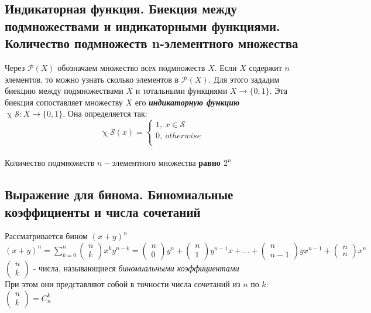 \documentclass[a4paper]{article}
\begin{document}
\subsection{Индикаторная функция. Биекция между подмножествами и индикаторными функциями. Количество подмножеств n-элементного множества}
\label{sec:1.35}Через $\mathcal{P}(X)$ обозначаем множество всех подмножеств $X$. Если $X$ содержит $n$ элементов, то можно узнать сколько элементов в $\mathcal{P}(X)$. Для этого зададим биекцию между подмножествами $X$ и тотальными функциями $X\rightarrow\{0,1\}$. Эта биекция сопоставляет множеству $X$ его \textit{\textbf{индикаторную функцию}} $\upchi\mathcal{S}: X\rightarrow\{0,1\}$. Она определяется так:\\[2mm]
$$\upchi\mathcal{S}(x)=\begin{cases}
1,\ x\in\mathcal{S}\\
0,\ otherwise\\
\end{cases}$$\\[2mm]
Количество подмножеств $n-$элементного множества \textbf{равно $2^n$}
\subsection{Выражение для бинома. Биномиальные коэффициенты и числа сочетаний}
Рассматривается бином $(x+y)^n$\\[2mm]
\indent $(x+y)^n=\sum\limits_{k=0}^n \begin{pmatrix}
    n\\
    k
\end{pmatrix}x^ky^{n-k}=\begin{pmatrix}
    n\\
    0
\end{pmatrix}y^n+\begin{pmatrix}
    n\\
    1
\end{pmatrix}y^{n-1}x+\ldots+\begin{pmatrix}
    n\\
    n-1
\end{pmatrix}yx^{n-1}+\begin{pmatrix}
    n\\
    n
\end{pmatrix}x^n$\\[2mm]
\indent$\begin{pmatrix}
    n\\
    k
\end{pmatrix}$ - числа, называющиеся \textit{биномиальными коэффициентами}\\[2mm]
\indent При этом они представляют собой в точности числа сочетаний из $n$ по $k$: $\begin{pmatrix}
    n\\
    k
\end{pmatrix}=C^k_n$
\end{document}
